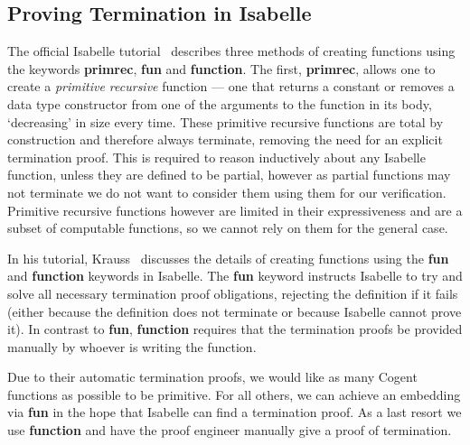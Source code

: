 \subsection{Proving Termination in Isabelle}

The official Isabelle tutorial~\citep{IsabelleTutorial} describes three methods of creating functions using
the keywords \textbf{primrec}, \textbf{fun} and \textbf{function}. The first, \textbf{primrec},
allows one to create a \textit{primitive recursive} function --- one that returns a constant or removes
a data type constructor from one of the arguments to the function in its body, `decreasing' in size every time.
These primitive recursive functions are total by construction and therefore always terminate, removing the need for
an explicit termination proof. This is required to reason inductively about any Isabelle function,
unless they are defined to be partial, however as partial functions may not terminate we do not want
to consider them using them for our verification. Primitive recursive functions however are limited
in their expressiveness and are a subset of computable functions, so we cannot rely on them for the general case.

In his tutorial, Krauss~\citep{KraussIsabelle} discusses the details of creating functions using the \textbf{fun}
and \textbf{function} keywords in Isabelle. The \textbf{fun} keyword instructs Isabelle to try and solve all necessary
termination proof obligations, rejecting the definition if it fails (either because the definition does not 
terminate or because Isabelle cannot prove it). In contrast to \textbf{fun}, \textbf{function}
requires that the termination proofs be provided manually by whoever is writing the function.


Due to their automatic termination proofs, we would like as many Cogent functions as possible to be
primitive. For all others, we can achieve an embedding via \textbf{fun} in the hope that Isabelle can find
a termination proof. As a last resort we use \textbf{function} and have the proof engineer 
manually give a proof of termination. 

